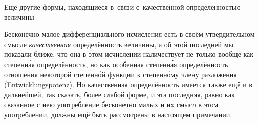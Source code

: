 \subsubremark%
{Ещё другие формы, находящиеся в~связи с~качественной
определённостью величины}

\label{bkm:bm53a}
Бесконечно-малое дифференциального исчисления есть в своём утвердительном
смысле {\em качественная} определённость величины, а об этой последней мы
показали ближе, что она в этом исчислении наличествует не только вообще как
степенн\'{а}я определённость, но как особенная степенн\'{а}я определённость
отношения некоторой степенн\'{о}й функции к степенн\'{о}му члену разложения
(Ent\-wick\-lungs\-potenz). Но качественная
определённость имеется также ещё и в дальнейшей, так сказать, более слабой
форме, и эта последняя, равно как связанное с нею употребление бесконечно малых
и их смысл в этом употреблении, должны ещё быть рассмотрены в настоящем
примечании.

